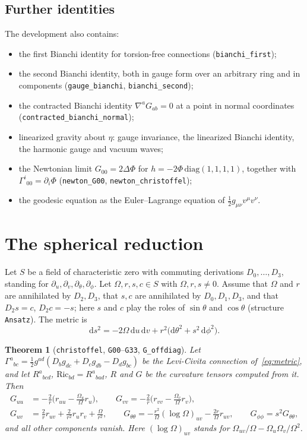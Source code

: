 \documentclass[11pt]{amsart}
\newtheorem{theorem}{Theorem}[section]
\theoremstyle{definition}
\theoremstyle{remark}
\newcommand{\lean}[1]{\texttt{#1}}
\newcommand{\dd}{\mathrm{d}}
\begin{document}
\subsection{Further identities}
The development also contains:
\begin{itemize}
\item the first Bianchi identity for torsion-free connections (\lean{bianchi\_first});
\item the second Bianchi identity, both in gauge form over an arbitrary ring and in components (\lean{gauge\_bianchi}, \lean{bianchi\_second});
\item the contracted Bianchi identity $\nabla^aG_{ab}=0$ at a point in normal coordinates (\lean{contracted\_bianchi\_normal});
\item linearized gravity about $\eta$: gauge invariance, the linearized Bianchi identity, the harmonic gauge and vacuum waves;
\item the Newtonian limit $G_{00}=2\Delta\Phi$ for $h=-2\Phi\,\mathrm{diag}(1,1,1,1)$, together with $\Gamma^i{}_{00}=\partial_i\Phi$ (\lean{newton\_G00}, \lean{newton\_christoffel});
\item the geodesic equation as the Euler--Lagrange equation of $\frac12g_{\mu\nu}v^\mu v^\nu$.
\end{itemize}

\section{The spherical reduction}\label{sec:reduction}

Let $S$ be a field of characteristic zero with commuting derivations $D_0,\dots,D_3$, standing for $\partial_u,\partial_v,\partial_\theta,\partial_\phi$. Let $\Omega,r,s,c\in S$ with $\Omega,r,s\ne0$. Assume that $\Omega$ and $r$ are annihilated by $D_2,D_3$, that $s,c$ are annihilated by $D_0,D_1,D_3$, and that $D_2s=c$, $D_2c=-s$; here $s$ and $c$ play the roles of $\sin\theta$ and $\cos\theta$ (structure \lean{Ansatz}). The metric is
\begin{equation}\label{eq:metric}
\dd s^2=-2\Omega\,\dd u\,\dd v+r^2\big(\dd\theta^2+s^2\,\dd\phi^2\big).
\end{equation}

\begin{theorem}[\lean{christoffel}, \lean{G00}--\lean{G33}, \lean{G\_offdiag}]\label{thm:G}
Let $\Gamma^a{}_{bc}=\frac12g^{ad}(D_bg_{dc}+D_cg_{db}-D_dg_{bc})$ be the Levi-Civita connection of~\eqref{eq:metric}, and let $R^a{}_{bcd}$, $\mathrm{Ric}_{bd}=R^a{}_{bad}$, $R$ and $G$ be the curvature tensors computed from it. Then
\begin{align*}
G_{uu}&=-\tfrac{2}{r}\big(r_{uu}-\tfrac{\Omega_u}{\Omega}r_u\big),\qquad
G_{vv}=-\tfrac{2}{r}\big(r_{vv}-\tfrac{\Omega_v}{\Omega}r_v\big),\\
G_{uv}&=\tfrac{2}{r}r_{uv}+\tfrac{2}{r^2}r_ur_v+\tfrac{\Omega}{r^2},\qquad
G_{\theta\theta}=-\tfrac{r^2}{\Omega}(\log\Omega)_{uv}-\tfrac{2r}{\Omega}r_{uv},\qquad
G_{\phi\phi}=s^2G_{\theta\theta},
\end{align*}
and all other components vanish. Here $(\log\Omega)_{uv}$ stands for $\Omega_{uv}/\Omega-\Omega_u\Omega_v/\Omega^2$.
\end{theorem}
\end{document}
